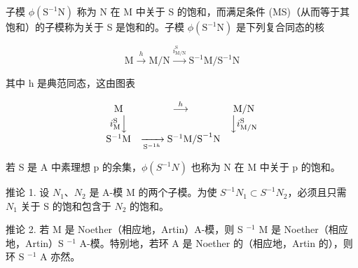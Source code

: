 子模 \(\phi(\mathrm{S}^{-1}\mathrm{N})\) 称为 N 在 M 中关于 S 的饱和，而满足条件 (MS)（从而等于其饱和）的子模称为关于 S 是饱和的。子模 \(\phi(\mathrm{S}^{-1}\mathrm{N})\) 是下列复合同态的核

\[
\mathrm{M} \xrightarrow {h} \mathrm{M} / \mathrm{N} \xrightarrow {i _ {\mathrm{M} / \mathrm{N}} ^ {\mathrm{S}}} \mathrm{S} ^ {- 1} \mathrm{M} / \mathrm{S} ^ {- 1} \mathrm{N}
\]

其中 h 是典范同态，这由图表

\[
\begin{array}{c c c} \mathrm{M} & \stackrel {{h}} {{\longrightarrow}} & \mathrm{M/N} \\ i _ {\mathrm{M}} ^ {\mathrm{S}} \Big \downarrow & & \Big \downarrow i _ {\mathrm{M/N}} ^ {\mathrm{S}} \\ \mathrm{S} ^ {- 1} \mathrm{M} & \xrightarrow [ \mathrm{S} ^ {- 1 h} ]{} \mathrm{S} ^ {- 1} \mathrm{M/S} ^ {- 1} \mathrm{N} \end{array}
\]

若 S 是 A 中素理想 p 的余集，\(\phi(S^{-1}N)\) 也称为 N 在 M 中关于 p 的饱和。

推论 1. 设 \(N_{1}\)、\(N_{2}\) 是 A-模 M 的两个子模。为使 \(S^{-1}N_{1} \subset S^{-1}N_{2}\)，必须且只需 \(N_{1}\) 关于 S 的饱和包含于 \(N_{2}\) 的饱和。

推论 2. 若 M 是 Noether（相应地，Artin）A-模，则 S \(^{-1}\) M 是 Noether（相应地，Artin）S \(^{-1}\) A-模。特别地，若环 A 是 Noether 的（相应地，Artin 的），则环 S \(^{-1}\) A 亦然。


